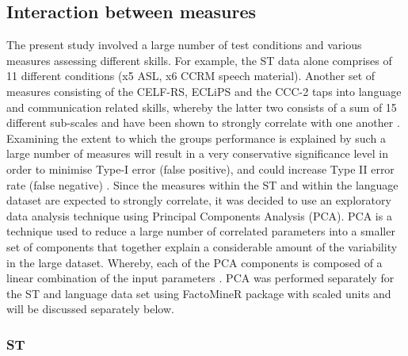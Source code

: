 \documentclass[a4paper, twoside]{templates/ociamthesis}
\begin{document}
\hypertarget{interaction-between-measures}{%
\subsection{Interaction between measures}\label{interaction-between-measures}}

The present study involved a large number of test conditions and various measures assessing different skills. For example, the ST data alone comprises of 11 different conditions (x5 ASL, x6 CCRM speech material). Another set of measures consisting of the CELF-RS, ECLiPS and the CCC-2 taps into language and communication related skills, whereby the latter two consists of a sum of 15 different sub-scales and have been shown to strongly correlate with one another \autocite{Barry2014}. Examining the extent to which the groups performance is explained by such a large number of measures will result in a very conservative significance level in order to minimise Type-I error (false positive), and could increase Type II error rate (false negative) \autocite{McDonald2014}. Since the measures within the ST and within the language dataset are expected to strongly correlate, it was decided to use an exploratory data analysis technique using Principal Components Analysis (PCA). PCA is a technique used to reduce a large number of correlated parameters into a smaller set of components that together explain a considerable amount of the variability in the large dataset. Whereby, each of the PCA components is composed of a linear combination of the input parameters \autocite{JamesGareth2013}. PCA was performed separately for the ST and language data set using FactoMineR package \autocite{Le2008} with scaled units and will be discussed separately below.

\hypertarget{st-1}{%
\subsubsection{ST}\label{st-1}}
\end{document}
